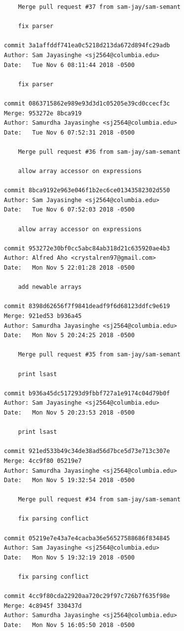 \documentclass[12pt]{article}
\begin{document}
\begin{lstlisting}
    Merge pull request #37 from sam-jay/sam-semant
    
    fix parser

commit 3a1affddf741ea0c5218d213da672d894fc29adb
Author: Sam Jayasinghe <sj2564@columbia.edu>
Date:   Tue Nov 6 08:11:44 2018 -0500

    fix parser

commit 0863715862e989e93d3d1c05205e39cd0ccecf3c
Merge: 953272e 8bca919
Author: Samurdha Jayasinghe <sj2564@columbia.edu>
Date:   Tue Nov 6 07:52:31 2018 -0500

    Merge pull request #36 from sam-jay/sam-semant
    
    allow array accessor on expressions

commit 8bca9192e963e046f1b2ec6ce01343582302d550
Author: Sam Jayasinghe <sj2564@columbia.edu>
Date:   Tue Nov 6 07:52:03 2018 -0500

    allow array accessor on expressions

commit 953272e30bf0cc5abc84ab318d21c635920ae4b3
Author: Alfred Aho <crystalren97@gmail.com>
Date:   Mon Nov 5 22:01:28 2018 -0500

    add newable arrays

commit 8398d62656f7f9841deadf9f6d68123ddfc9e619
Merge: 921ed53 b936a45
Author: Samurdha Jayasinghe <sj2564@columbia.edu>
Date:   Mon Nov 5 20:24:25 2018 -0500

    Merge pull request #35 from sam-jay/sam-semant
    
    print lsast

commit b936a45dc517293d9fbbf727a1e9174c04d79b0f
Author: Sam Jayasinghe <sj2564@columbia.edu>
Date:   Mon Nov 5 20:23:53 2018 -0500

    print lsast

commit 921ed533b49c34de38ad56d7bce5d73e713c307e
Merge: 4cc9f80 05219e7
Author: Samurdha Jayasinghe <sj2564@columbia.edu>
Date:   Mon Nov 5 19:32:54 2018 -0500

    Merge pull request #34 from sam-jay/sam-semant
    
    fix parsing conflict

commit 05219e7e43a7e4cacba36e56527588686f834845
Author: Sam Jayasinghe <sj2564@columbia.edu>
Date:   Mon Nov 5 19:32:19 2018 -0500

    fix parsing conflict

commit 4cc9f80cda22920aa720c29f97c726b7f635f98e
Merge: 4c8945f 330437d
Author: Samurdha Jayasinghe <sj2564@columbia.edu>
Date:   Mon Nov 5 16:05:50 2018 -0500


\end{lstlisting}
\end{document}
